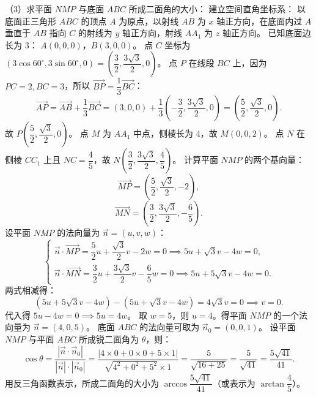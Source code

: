 \begin{answer}
（3）求平面 $NMP$ 与底面 $ABC$ 所成二面角的大小：
建立空间直角坐标系：
以底面正三角形 $ABC$ 的顶点 $A$ 为原点，以射线 $AB$ 为 $x$ 轴正方向，在底面内过 $A$ 垂直于 $AB$ 指向 $C$ 的射线为 $y$ 轴正方向，射线 $AA_1$ 为 $z$ 轴正方向。
已知底面边长为 $3$：
$A(0, 0, 0)$，$B(3, 0, 0)$。
点 $C$ 坐标为 $\left(3\cos 60^\circ, 3\sin 60^\circ, 0\right)=\left(\dfrac{3}{2}, \dfrac{3\sqrt{3}}{2}, 0\right)$。
点 $P$ 在线段 $BC$ 上，因为 $PC=2, BC=3$，所以 $\vec{BP}=\dfrac{1}{3}\vec{BC}$：
\nopagebreak[4]
\[
\vec{AP}=\vec{AB}+\frac{1}{3}\vec{BC}=(3, 0, 0)+\frac{1}{3}\left(-\frac{3}{2}, \frac{3\sqrt{3}}{2}, 0\right)=\left(\frac{5}{2}, \frac{\sqrt{3}}{2}, 0\right).
\]
故 $P\left(\dfrac{5}{2}, \dfrac{\sqrt{3}}{2}, 0\right)$。
点 $M$ 为 $AA_1$ 中点，侧棱长为 $4$，故 $M(0, 0, 2)$。
点 $N$ 在侧棱 $CC_1$ 上且 $NC=\dfrac{4}{5}$，故 $N\left(\dfrac{3}{2}, \dfrac{3\sqrt{3}}{2}, \dfrac{4}{5}\right)$。
计算平面 $NMP$ 的两个基向量：
\nopagebreak[4]
\[
\vec{MP}=\left(\frac{5}{2}, \frac{\sqrt{3}}{2}, -2\right),
\]
\nopagebreak[4]
\[
\vec{MN}=\left(\frac{3}{2}, \frac{3\sqrt{3}}{2}, -\frac{6}{5}\right).
\]
设平面 $NMP$ 的法向量为 $\vec{n}=(u, v, w)$：
\nopagebreak[4]
\[
\begin{cases}
\vec{n}\cdot\vec{MP}=\dfrac{5}{2}u+\dfrac{\sqrt{3}}{2}v-2w=0 \implies 5u+\sqrt{3}v-4w=0, \\
\vec{n}\cdot\vec{MN}=\dfrac{3}{2}u+\dfrac{3\sqrt{3}}{2}v-\dfrac{6}{5}w=0 \implies 5u+5\sqrt{3}v-4w=0.
\end{cases}
\]
两式相减得：
\nopagebreak[4]
\[
(5u+5\sqrt{3}v-4w)-(5u+\sqrt{3}v-4w)=4\sqrt{3}v=0\implies v=0.
\]
代入得 $5u-4w=0\implies 5u=4w$。
取 $w=5$，则 $u=4$。得平面 $NMP$ 的一个法向量为 $\vec{n}=(4, 0, 5)$。
底面 $ABC$ 的法向量可取为 $\vec{n}_0=(0, 0, 1)$。
设平面 $NMP$ 与平面 $ABC$ 所成锐二面角为 $\theta$，则：
\nopagebreak[4]
\[
\cos\theta=\frac{|\vec{n}\cdot\vec{n}_0|}{|\vec{n}|\cdot|\vec{n}_0|}=\frac{|4\times 0+0\times 0+5\times 1|}{\sqrt{4^2+0^2+5^2}\times 1}=\frac{5}{\sqrt{16+25}}=\frac{5}{\sqrt{41}}=\frac{5\sqrt{41}}{41}.
\]
用反三角函数表示，所成二面角的大小为 $\arccos\dfrac{5\sqrt{41}}{41}$（或表示为 $\arctan\dfrac{4}{5}$）。


\end{answer}
